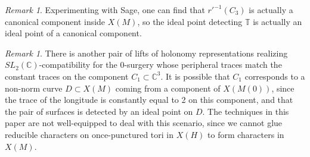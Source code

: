 \documentclass{article}
\theoremstyle{plain}
\theoremstyle{definition}
\theoremstyle{plain}
\theoremstyle{plain}
\theoremstyle{plain}
\theoremstyle{remark}
\newtheorem{remark}[theorem]{Remark}
\theoremstyle{remark}
\theoremstyle{plain}
\theoremstyle{plain}
\begin{document}
\begin{remark}
Experimenting with Sage, one can find that $r'^{-1}(C_3)$ is actually a canonical component inside $X(M)$, so the ideal point detecting $\mathbb{T}$ is actually an ideal point of a canonical component. 
\end{remark}

\begin{remark}
There is another pair of lifts of holonomy representations realizing $SL_2(\mathbb{C})$-compatibility for the 0-surgery whose peripheral traces match the constant traces on the component $C_1 \subset \mathbb{C}^3$. It is possible that $C_1$ corresponds to a non-norm curve $D \subset X(M)$ coming from a component of $X(M(0))$, since the trace of the longitude is constantly equal to 2 on this component, and that the pair of surfaces is detected by an ideal point on $D$. The techniques in this paper are not well-equipped to deal with this scenario, since we cannot glue reducible characters on once-punctured tori in $X(H)$ to form characters in $X(M)$. 
\end{remark}



\end{document}
